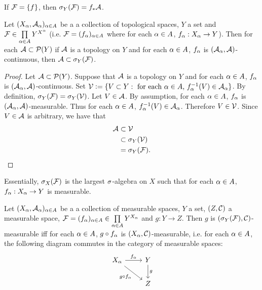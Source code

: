 \documentclass{book}
\begin{document}
	\begin{note}
		If $\mathcal{F} = \{f\}$, then $\sigma_Y(\mathcal{F}) = f_*\mathcal{A}$.
	\end{note}
	
	\begin{ex} 
		Let $(X_{\alpha}, \mathcal{A}_{\alpha})_{\alpha \in A}$ be a a collection of topological spaces, $Y$ a set and $\mathcal{F} \in \prod \limits_{\alpha \in A}Y^{X^{\alpha}}$ (i.e. $\mathcal{F} = (f_{\alpha})_{\alpha \in A}$ where for each $\alpha \in A$, $f_{\alpha}:X_{\alpha} \rightarrow Y$). Then for each $\mathcal{A} \subset \mathcal{P}(Y)$ if $\mathcal{A}$ is a topology on $Y$ and for each $\alpha \in A$, $f_{\alpha}$ is $(\mathcal{A}_{\alpha}, \mathcal{A})$-continuous, then $\mathcal{A} \subset \sigma_Y(\mathcal{F})$.
	\end{ex}
	
	\begin{proof}
		Let $\mathcal{A} \subset \mathcal{P}(Y)$. Suppose that $\mathcal{A}$ is a topology on $Y$ and for each $\alpha \in A$, $f_{\alpha}$ is $(\mathcal{A}_{\alpha}, \mathcal{A})$-continuous. Set $\mathcal{V} \vcentcolon= \{V \subset Y: \text{ for each $\alpha \in A$, $f_{\alpha}^{-1}(V) \in \mathcal{A}_{\alpha}$}\}$. By definition, $\sigma_Y(\mathcal{F}) = \sigma_Y(\mathcal{V})$. Let $V \in \mathcal{A}$. By assumption, for each $\alpha \in A$, $f_{\alpha}$ is $(\mathcal{A}_{\alpha}, \mathcal{A})$-measurable. Thus for each $\alpha \in A$, $f_{\alpha}^{-1}(V) \in \mathcal{A}_{\alpha}$. Therefore $V \in \mathcal{V}$. Since $V \in \mathcal{A}$ is arbitrary, we have that 
		\begin{align*}
			\mathcal{A} 
			& \subset \mathcal{V} \\
			& \subset \sigma_Y(\mathcal{V}) \\
			& = \sigma_Y(\mathcal{F}).
		\end{align*}
	\end{proof}
	
	\begin{note}
		Essentially, $\sigma_X(\mathcal{F})$ is the largest $\sigma$-algebra on $X$ such that for each $\alpha \in A$, $f_{\alpha}:X_{\alpha} \rightarrow Y$ is measurable. 
	\end{note}
	
	\begin{ex} 
		Let $(X_{\alpha}, \mathcal{A}_{\alpha})_{\alpha \in A}$ be a a collection of measurable spaces, $Y$ a set, $(Z, \mathcal{C})$ a measurable space, $\mathcal{F} = (f_{\alpha})_{\alpha \in A} \in \prod \limits_{\alpha \in A}Y^{X_{\alpha}}$ and $g: Y \rightarrow Z$. Then $g$ is $(\sigma_Y(\mathcal{F}), \mathcal{C})$-measurable iff for each $\alpha \in A$, $g \circ f_{\alpha}$ is $(X_{\alpha}, \mathcal{C})$-measurable, i.e. for each $\alpha \in A$, the following diagram commutes in the category of measurable spaces: 
		\[ \begin{tikzcd}
			X_{\al} \arrow[r, "f_{\al}"] \arrow[dr, "g \circ f_{\al}"'] 	
			& Y  \arrow[d, "g"] \\
			& Z 
		\end{tikzcd}
		\]
	\end{ex}
	
\end{document}
